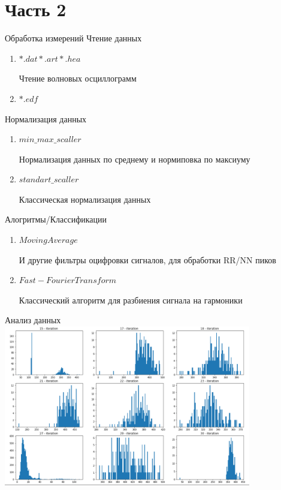\documentclass[xcolor=table]{beamer}
\begin{document}
\section{Часть 2}
\begin{frame}{Обработка измерений}
Чтение данных 
\begin{enumerate}
    \item $*.dat *.art *.hea$
    
    Чтение волновых осциллограмм
    
    \item $*.edf$

\end{enumerate}

Нормализация данных
\begin{enumerate}
    \item $min\_max\_scaller$

    Нормализация данных по среднему и нормиповка по максиуму
    
    \item $standart\_scaller$

    Классическая нормализация данных
    
\end{enumerate}

Алогритмы/Классификации
\begin{enumerate}
    \item $Moving Average$
    
    И другие фильтры оцифровки сигналов, для обработки RR/NN пиков
    
    \item $Fast-Fourier Transform$

    Классический алгоритм для разбиения сигнала на гармоники
    
\end{enumerate}


\end{frame}

\begin{frame}{Анализ данных}
\centering
\includegraphics[height=7cm]{Распределение3.png}
\end{frame}
\end{document}
